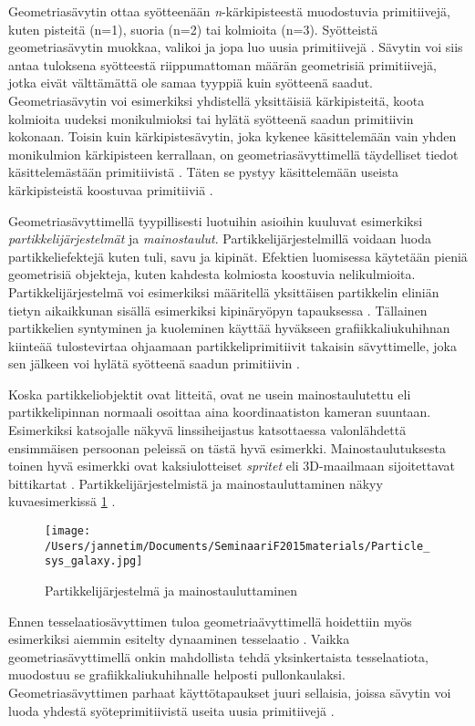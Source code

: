 \documentclass[finnish]{tktltiki2}
\theoremstyle{definition}
\theoremstyle{remark}
\begin{document}
Geometriasävytin ottaa syötteenään \emph{n}-kärkipisteestä muodostuvia primitiivejä, kuten pisteitä (n=1), suoria (n=2) tai kolmioita (n=3).  Syötteistä geometriasävytin muokkaa, valikoi ja jopa luo uusia primitiivejä \cite[s. 500]{Gre14}. Sävytin voi siis antaa tuloksena syötteestä riippumattoman määrän geometrisiä primitiivejä, jotka eivät välttämättä ole samaa tyyppiä kuin syötteenä saadut. Geometriasävytin voi esimerkiksi yhdistellä yksittäisiä kärkipisteitä, koota kolmioita uudeksi monikulmioksi tai hylätä syötteenä saadun primitiivin kokonaan. Toisin kuin kärkipistesävytin, joka kykenee käsittelemään vain yhden monikulmion kärkipisteen kerrallaan, on geometriasävyttimellä täydelliset tiedot käsittelemästään primitiivistä \cite{Khr15}. Täten se pystyy käsittelemään useista kärkipisteistä koostuvaa primitiiviä \cite{Mic11}.

Geometriasävyttimellä tyypillisesti luotuihin asioihin kuuluvat esimerkiksi \emph{partikkelijärjestelmät} ja \emph{mainostaulut}. Partikkelijärjestelmillä voidaan luoda partikkeliefektejä kuten tuli, savu ja kipinät. Efektien luomisessa käytetään pieniä geometrisiä objekteja, kuten kahdesta kolmiosta koostuvia nelikulmioita. Partikkelijärjestelmä voi esimerkiksi määritellä yksittäisen partikkelin eliniän tietyn aikaikkunan sisällä esimerkiksi kipinäryöpyn tapauksessa \cite[s. 533-534]{Gre14}. Tällainen partikkelien syntyminen ja kuoleminen käyttää hyväkseen grafiikkaliukuhihnan kiinteää tulostevirtaa ohjaamaan partikkeliprimitiivit takaisin sävyttimelle, joka sen jälkeen voi hylätä syötteenä saadun primitiivin \cite{Mic11}.

Koska partikkeliobjektit ovat litteitä, ovat ne usein mainostaulutettu eli partikkelipinnan normaali osoittaa aina koordinaatiston kameran suuntaan. Esimerkiksi katsojalle näkyvä linssiheijastus katsottaessa valonlähdettä ensimmäisen persoonan peleissä on tästä hyvä esimerkki. Mainostaulutuksesta toinen hyvä esimerkki ovat kaksiulotteiset \emph{spritet} eli 3D-maailmaan sijoitettavat bittikartat \cite[s. 216-217]{Puh08}. Partikkelijärjestelmistä ja mainostauluttaminen näkyy kuvaesimerkissä \ref{billboard} \cite{Tsi06}.

\begin{figure}[!htpb]
\centering
\texttt{[image: /Users/jannetim/Documents/SeminaariF2015materials/Particle\_sys\_galaxy.jpg]}
\caption{Partikkelijärjestelmä ja mainostauluttaminen}
\label{billboard}
\end{figure}

Ennen tesselaatiosävyttimen tuloa geometriaävyttimellä hoidettiin myös esimerkiksi aiemmin esitelty dynaaminen tesselaatio \cite{Mic11}. Vaikka geometriasävyttimellä onkin mahdollista tehdä yksinkertaista tesselaatiota, muodostuu se grafiikkaliukuhihnalle helposti pullonkaulaksi. Geometriasävyttimen parhaat käyttötapaukset juuri sellaisia, joissa sävytin voi luoda yhdestä syöteprimitiivistä useita uusia primitiivejä \cite{Sch14}.
\end{document}
